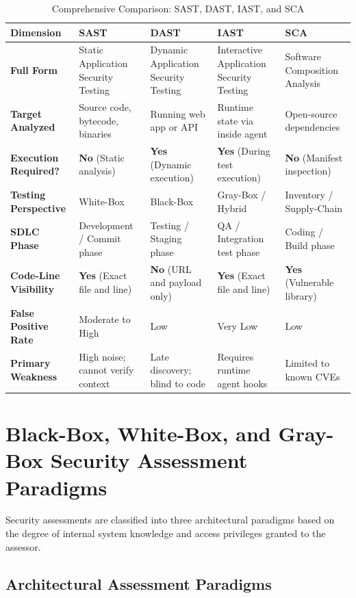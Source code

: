\begin{table}[htbp]
\centering
\caption{Comprehensive Comparison: SAST, DAST, IAST, and SCA}
\label{tab:security_testing_modalities}
\begin{tabularx}{\textwidth}{p{2.8cm} X X X X}
\toprule
\textbf{Dimension} & \textbf{SAST} & \textbf{DAST} & \textbf{IAST} & \textbf{SCA} \\
\midrule
\textbf{Full Form} & Static Application Security Testing & Dynamic Application Security Testing & Interactive Application Security Testing & Software Composition Analysis \\
\textbf{Target Analyzed} & Source code, bytecode, binaries & Running web app or API & Runtime state via inside agent & Open-source dependencies \\
\textbf{Execution Required?} & \textbf{No} (Static analysis) & \textbf{Yes} (Dynamic execution) & \textbf{Yes} (During test execution) & \textbf{No} (Manifest inspection) \\
\textbf{Testing Perspective} & White-Box & Black-Box & Gray-Box / Hybrid & Inventory / Supply-Chain \\
\textbf{SDLC Phase} & Development / Commit phase & Testing / Staging phase & QA / Integration test phase & Coding / Build phase \\
\textbf{Code-Line Visibility} & \textbf{Yes} (Exact file and line) & \textbf{No} (URL and payload only) & \textbf{Yes} (Exact file and line) & \textbf{Yes} (Vulnerable library) \\
\textbf{False Positive Rate} & Moderate to High & Low & Very Low & Low \\
\textbf{Primary Weakness} & High noise; cannot verify context & Late discovery; blind to code & Requires runtime agent hooks & Limited to known CVEs \\
\bottomrule
\end{tabularx}
\end{table}

\newpage
\section{Black-Box, White-Box, and Gray-Box Security Assessment Paradigms}

Security assessments are classified into three architectural paradigms based on the degree of internal system knowledge and access privileges granted to the assessor.

\subsection{Architectural Assessment Paradigms}

